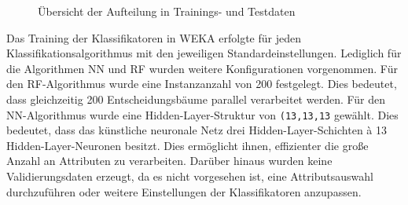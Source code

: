 \begin{figure}[t]
  \qquad
  \qquad
  \caption{Übersicht der Aufteilung in Trainings- und Testdaten\label{fig:splits}}
\end{figure}

Das Training der Klassifikatoren in WEKA erfolgte für jeden Klassifikationsalgorithmus mit den jeweiligen Standardeinstellungen. Lediglich für die Algorithmen NN und RF wurden weitere Konfigurationen vorgenommen. Für den RF-Algorithmus wurde eine Instanzanzahl von 200 festgelegt. Dies bedeutet, dass gleichzeitig 200 Entscheidungsbäume parallel verarbeitet werden. Für den NN-Algorithmus wurde eine Hidden-Layer-Struktur von \texttt{(13,13,13} gewählt. Dies bedeutet, dass das künstliche neuronale Netz drei Hidden-Layer-Schichten à 13 Hidden-Layer-Neuronen besitzt. Dies ermöglicht ihnen, effizienter die große Anzahl an Attributen zu verarbeiten. Darüber hinaus wurden keine Validierungsdaten erzeugt, da es nicht vorgesehen ist, eine Attributsauswahl durchzuführen oder weitere Einstellungen der Klassifikatoren anzupassen.

